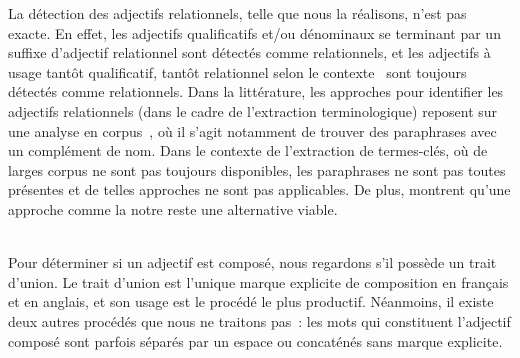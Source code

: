       La détection des adjectifs relationnels, telle que nous la réalisons,
      n'est pas exacte. En effet, les adjectifs qualificatifs et/ou
      dénominaux se terminant par un suffixe d'adjectif relationnel sont
      détectés comme relationnels, et les adjectifs à usage tantôt qualificatif,
      tantôt relationnel selon le contexte~\cite{maniez2009denominaladjectives}
      sont toujours détectés comme relationnels. Dans la littérature, les
      approches pour identifier les adjectifs relationnels (dans le cadre de
      l'extraction terminologique) reposent sur une analyse en
      corpus~\cite{daille2000relationaladjectives,maniez2005automaticrelationaladjectiveidentification,harastani2013relationaladjectivetranslation},
      où il s'agit notamment de trouver des paraphrases avec un complément de
      nom. Dans le contexte de l'extraction de termes-clés, où de larges corpus
      ne sont pas toujours disponibles, les paraphrases ne sont pas toutes
      présentes et de telles approches ne sont pas applicables. De plus,
       montrent qu'une
      approche comme la notre reste une alternative viable.

      ~\\Pour déterminer si un adjectif est composé, nous regardons s'il possède
      un trait d'union. Le trait d'union est l'unique marque explicite de
      composition en français et en anglais, et son usage est le procédé le plus
      productif. Néanmoins, il existe deux autres procédés que nous ne traitons
      pas~: les mots qui constituent l'adjectif composé sont parfois séparés
      par un espace ou concaténés sans marque explicite.


